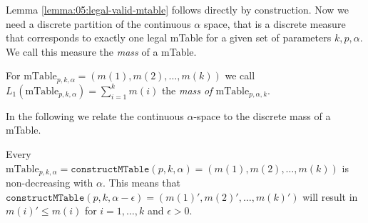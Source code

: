 %
\noindent Lemma \ref{lemma:05:legal-valid-mtable} follows directly by construction.
%
Now we need a discrete partition of the continuous $\alpha$ space, that is a discrete measure that corresponds to exactly one legal mTable for a given set of parameters $k,p,\alpha$. 
%
We call this measure the \emph{mass} of a mTable.
%
%
%
%
\begin{definition}
	\label{def:05:Mass of a MTable}
	For $\text{mTable}_{p,k,\alpha}=(m(1) , m(2) , \ldots , m(k))$ we call\\
	$L_1(\text{mTable}_{p,k,\alpha})=\sum_{i=1}^k m(i)$ the \textit{mass of $\text{mTable}_{p,\alpha,k}$}.
\end{definition}
%
In the following we relate the continuous $\alpha$-space to the discrete mass of a mTable.
%
\begin{lemma}
	\label{lemma:05:non-decreasing-with-alpha-mtable}
	Every $\text{mTable}_{p,k,\alpha}=\texttt{constructMTable}(p,k,\alpha)=(m(1) , m(2) , \ldots , m(k))$ is non-decreasing with $\alpha$. This means that
	$\texttt{constructMTable}(p,k,\alpha - \epsilon) = (m(1)' , m(2)' , \ldots , m(k)')$ will result in $m(i)' \leq m(i)$ for $i=1,\ldots,k$ and $\epsilon > 0$.
\end{lemma}

